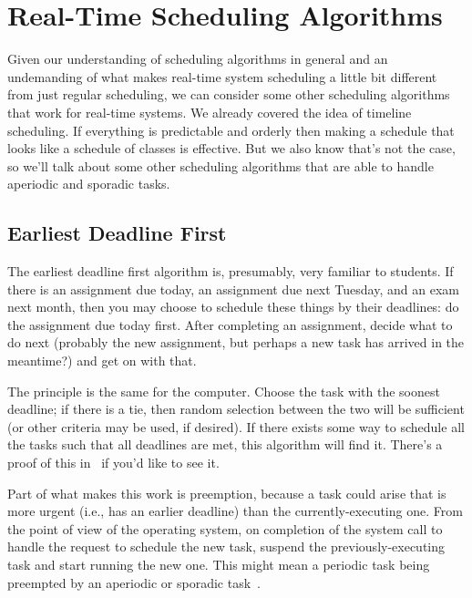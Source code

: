 




\section*{Real-Time Scheduling Algorithms}

Given our understanding of scheduling algorithms in general and an undemanding of what makes real-time system scheduling a little bit different from just regular scheduling, we can consider some other scheduling algorithms that work for real-time systems. We already covered the idea of timeline scheduling. If everything is predictable and orderly then making a schedule that looks like a schedule of classes is effective. But we also know that's not the case, so we'll talk about some other scheduling algorithms that are able to handle aperiodic and sporadic tasks.

\subsection*{Earliest Deadline First}

The earliest deadline first algorithm is, presumably, very familiar to students. If there is an assignment due today, an assignment due next Tuesday, and an exam next month, then you may choose to schedule these things by their deadlines: do the assignment due today first. After completing an assignment, decide what to do next (probably the new assignment, but perhaps a new task has arrived in the meantime?) and get on with that.

The principle is the same for the computer. Choose the task with the soonest deadline; if there is a tie, then random selection between the two will be sufficient (or other criteria may be used, if desired). If there exists some way to schedule all the tasks such that all deadlines are met, this algorithm will find it. There's a proof of this in~\cite{mte241} if you'd like to see it.

Part of what makes this work is preemption, because a task could arise that is more urgent (i.e., has an earlier deadline) than the currently-executing one. From the point of view of the operating system, on completion of the system call to handle the request to schedule the new task, suspend the previously-executing task and start running the new one. This might mean a periodic task being preempted by an aperiodic or sporadic task~\cite{mte241}.

